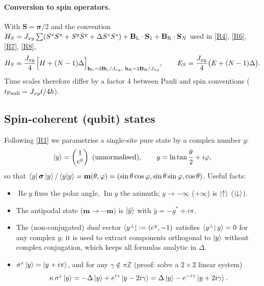 \documentclass[11pt,a4paper]{article}
\theoremstyle{definition}
\newcommand{\hL}{\mathbf h_{\mathrm L}}
\newcommand{\hR}{\mathbf h_{\mathrm R}}
\newcommand{\bsig}{\boldsymbol\sigma}
\newcommand{\re}{\operatorname{Re}}
\newcommand{\im}{\operatorname{Im}}
\begin{document}
\paragraph{Conversion to spin operators.} With $\mathbf S=\bsig/2$ and the convention $H_{S}=J_{xy}\sum(S^xS^x+S^yS^y+\Delta S^zS^z)+\mathbf B_{\rm L}\cdot\mathbf S_1+\mathbf B_{\rm R}\cdot\mathbf S_N$ used in \ref{R4}, \ref{R6}, \ref{R7}, \ref{R8},
\begin{equation}\label{eq:spinconv}
H_S=\frac{J_{xy}}{4}\Big[H+(N-1)\Delta\Big]_{\hL=2\mathbf B_{\rm L}/J_{xy},\ \hR=2\mathbf B_{\rm R}/J_{xy}},\qquad E_S=\frac{J_{xy}}4\big(E+(N-1)\Delta\big).
\end{equation}
Time scales therefore differ by a factor 4 between Pauli and spin conventions ($t_{\rm Pauli}=J_{xy}t/4\hbar$).

\subsection{Spin-coherent (qubit) states}
Following \ref{R1} we parametrise a single-site pure state by a complex number $y$:
\begin{equation}\label{eq:qubit}
\ket{y}=\begin{pmatrix}1\\ e^{y}\end{pmatrix}\ \text{(unnormalised)},\qquad y=\ln\tan\frac{\theta}{2}+i\varphi ,
\end{equation}
so that $\bra{y}\bsig\ket{y}/\braket{y|y}=\mathbf m(\theta,\varphi)=(\sin\theta\cos\varphi,\sin\theta\sin\varphi,\cos\theta)$. Useful facts:
\begin{itemize}
\item $\re y$ fixes the polar angle, $\im y$ the azimuth; $y\to-\infty$ ($+\infty$) is $\ket\uparrow$ ($\ket\downarrow$).
\item The antipodal state ($\mathbf m\to-\mathbf m$) is $\ket{\bar y}$ with $\bar y=-y^*+i\pi$.
\item The (non-conjugated) \emph{dual} vector $\bra{y^\perp}:=(e^{y},-1)$ satisfies $\bra{y^\perp}y\rangle=0$ for any complex $y$; it is used to extract components orthogonal to $\ket y$ without complex conjugation, which keeps all formulas analytic in $\Delta$.
\item $\sigma^z\ket{y}=\ket{y+i\pi}$, and for any $\gamma\notin\pi\mathbb Z$ (proof: solve a $2\times2$ linear system)
\begin{equation}\label{eq:sz-decomp}
\kappa\,\sigma^z\ket y=-\Delta\ket y+e^{i\gamma}\ket{y-2i\gamma}=\Delta\ket y-e^{-i\gamma}\ket{y+2i\gamma}.
\end{equation}
\end{itemize}
\end{document}
